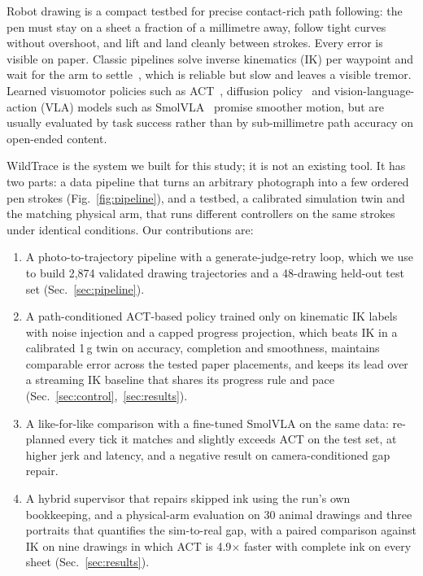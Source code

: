 \documentclass[conference]{IEEEtran}
\begin{document}
Robot drawing is a compact testbed for precise contact-rich path following: the pen must stay on a sheet a
fraction of a millimetre away, follow tight curves without overshoot, and lift and land cleanly between
strokes. Every error is visible on paper. Classic pipelines solve inverse kinematics (IK) per waypoint and
wait for the arm to settle~\cite{calinon2005humanoid,tresset2013paul}, which is reliable but slow and leaves a
visible tremor. Learned visuomotor policies such as ACT~\cite{zhao2023act}, diffusion
policy~\cite{chi2023diffusion} and vision-language-action (VLA) models such as SmolVLA~\cite{shukor2025smolvla}
promise smoother motion, but are usually evaluated by task success rather than by sub-millimetre path accuracy
on open-ended content.

WildTrace is the system we built for this study; it is not an existing tool. It has two parts: a data pipeline
that turns an arbitrary photograph into a few ordered pen strokes (Fig.~\ref{fig:pipeline}), and a testbed, a
calibrated simulation twin and the matching physical arm, that runs different controllers on the same strokes
under identical conditions. Our contributions are:
\begin{enumerate}
  \item A photo-to-trajectory pipeline with a generate-judge-retry loop, which we use to build 2,874 validated
        drawing trajectories and a 48-drawing held-out test set (Sec.~\ref{sec:pipeline}).
  \item A path-conditioned ACT-based policy trained only on kinematic IK labels with noise injection and a capped
        progress projection, which beats IK in a calibrated 1\,g twin on accuracy, completion and smoothness,
        maintains comparable error across the tested paper placements, and keeps its lead over a streaming IK baseline that shares its
        progress rule and pace (Sec.~\ref{sec:control},~\ref{sec:results}).
  \item A like-for-like comparison with a fine-tuned SmolVLA on the same data: re-planned every tick it matches
        and slightly exceeds ACT on the test set, at higher jerk and latency, and a negative result on
        camera-conditioned gap repair.
  \item A hybrid supervisor that repairs skipped ink using the run's own bookkeeping, and a physical-arm
        evaluation on 30 animal drawings and three portraits that quantifies the sim-to-real gap, with a paired
        comparison against IK on nine drawings in which ACT is 4.9$\times$ faster with complete ink on every sheet
        (Sec.~\ref{sec:results}).
\end{enumerate}
\end{document}
